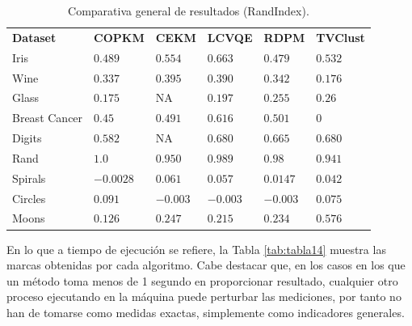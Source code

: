 \begin{table}[!h]
	\centering
	\setlength{\arrayrulewidth}{1mm}
	\setlength{\tabcolsep}{9pt}
	\renewcommand{\arraystretch}{0.8}
	
	\begin{tabular}{ >{\centering\arraybackslash}m{2.5cm}  >{\centering\arraybackslash}m{1.2cm}>{\centering\arraybackslash}m{1.1cm}>{\centering\arraybackslash}m{1.1cm}>{\centering\arraybackslash}m{1.1cm}>{\centering\arraybackslash}m{1.3cm}}
		\hline
		\rowcolor{black}
		\multicolumn{6}{c}{\bf \color{white}{Comparativa General de Resultados (RandIndex)}}\\
		\hline
		\rowcolor{gray!50}
		\textbf{Dataset} & \textbf{COPKM} & \textbf{CEKM} & \textbf{LCVQE} & \textbf{RDPM} & \textbf{TVClust}  \\
		Iris & $0.489$  & $0.554 $ & $\boldsymbol{0.663}$ & $0.479 $ & $0.532 $ \\
		Wine & $0.337$  & $\boldsymbol{0.395}$ & $0.390$ & $0.342 $ & $0.176 $ \\
		Glass & $0.175$  & NA & $0.197 $ & $\boldsymbol{0.255}$ & $0.26 $ \\
		Breast Cancer & $0.45$ & $0.491 $ & $\boldsymbol{0.616}$ & $0.501 $ & $0 $ \\
		Digits & $0.582$ & NA & $\boldsymbol{0.680}$ & $0.665 $ & $\boldsymbol{0.680}$ \\
		Rand & $\boldsymbol{1.0}$ & $0.950 $ & $0.989 $ & $0.98 $ & $0.941 $ \\
		Spirals & $-0.0028$ & $0.061 $ & $\boldsymbol{0.057}$  & $0.0147 $ & $0.042 $ \\
		Circles & $\boldsymbol{0.091}$  & $-0.003 $ & $-0.003 $ & $-0.003 $ & $0.075 $ \\
		Moons & $0.126$  & $0.247 $ & $0.215$ & $0.234 $ & $\boldsymbol{0.576}$ \\
		\hline
		
	\end{tabular}
	\caption{Comparativa general de resultados (RandIndex).}
	\label{tab:tabla13}
\end{table}

En lo que a tiempo de ejecución se refiere, la Tabla \ref{tab:tabla14} muestra las marcas obtenidas por cada algoritmo. Cabe destacar que, en los casos en los que un método toma menos de 1 segundo en proporcionar resultado, cualquier otro proceso ejecutando en la máquina puede perturbar las mediciones, por tanto no han de tomarse como medidas exactas, simplemente como indicadores generales.

